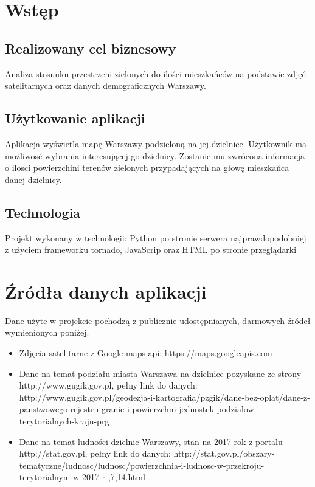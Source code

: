 \documentclass[a4paper,12p]{article}
\begin{document}
	\tableofcontents

	\section{Wstęp}
	\subsection{Realizowany cel biznesowy}
		Analiza stosunku przestrzeni zielonych do ilości mieszkańców na podstawie zdjęć satelitarnych oraz danych demograficznych Warszawy.
	\subsection{Użytkowanie aplikacji}
		Aplikacja wyświetla mapę Warszawy podzieloną na jej dzielnice. Użytkownik ma możliwosć wybrania interesującej go dzielnicy. Zostanie mu zwrócona informacja o ilosci powierzchini terenów zielonych przypadających na głowę mieszkańca danej dzielnicy.
	\subsection{Technologia}
		Projekt wykonany w technologii: Python po stronie serwera najprawdopodobniej z użyciem frameworku tornado, JavaScrip oraz HTML po stronie przeglądarki

	
	\section{Źródła danych aplikacji}
		Dane użyte w projekcie pochodzą z publicznie udostępnianych, darmowych źródeł wymienionych poniżej.
	
	\begin{itemize}
	\item Zdjęcia satelitarne z Google maps api: https://maps.googleapis.com
	\item Dane na temat podziału miasta Warszawa na dzielnice pozyskane ze strony http://www.gugik.gov.pl, pełny link do danych: http://www.gugik.gov.pl/geodezja-i-kartografia/pzgik/dane-bez-oplat/dane-z-panstwowego-rejestru-granic-i-powierzchni-jednostek-podzialow-terytorialnych-kraju-prg
	\item Dane na temat ludności dzielnic Warszawy, stan na 2017 rok z portalu http://stat.gov.pl, pełny link do danych: http://stat.gov.pl/obszary-tematyczne/ludnosc/ludnosc/powierzchnia-i-ludnosc-w-przekroju-terytorialnym-w-2017-r-,7,14.html
	\end{itemize}
\end{document}
